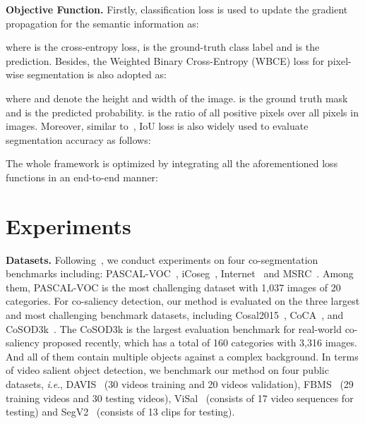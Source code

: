 \documentclass[journal]{IEEEtran}
\newcommand{\ie}{\textit{i}.\textit{e}., }
\begin{document}
\vspace{1ex}

\noindent \textbf{Objective Function.} Firstly, classification loss is used to update the gradient propagation for the semantic information as:


where  is the cross-entropy loss,  is the ground-truth class label and  is the prediction. Besides, the Weighted Binary Cross-Entropy (WBCE) loss for pixel-wise segmentation is also adopted as:



where  and  denote the height and width of the image.  is the ground truth mask and  is the predicted probability.  is the ratio of all positive pixels over all pixels in images. Moreover, similar to~\cite{qin2019basnet,fan2021group}, IoU loss is also widely used to evaluate segmentation accuracy as follows:



The whole framework is optimized by integrating all the aforementioned loss functions in an end-to-end manner:



\section{Experiments}

\noindent \textbf{Datasets.}  Following~\cite{zhang2021cyclesegnet,zhang2020deep}, we conduct experiments on four co-segmentation benchmarks including: PASCAL-VOC~\cite{everingham2015pascal}, iCoseg~\cite{batra2010icoseg}, Internet~\cite{rubinstein2013unsupervised} and MSRC~\cite{shotton2006textonboost}. Among them, PASCAL-VOC is the most challenging dataset with 1,037 images of 20 categories. 
For co-saliency detection, our method is evaluated on the three largest and most challenging benchmark datasets, including Cosal2015~\cite{zhang2015co}, CoCA~\cite{zhang2020gradient}, and CoSOD3k~\cite{fan2021re}. The CoSOD3k is the largest evaluation benchmark for real-world co-saliency proposed recently, which has a total of 160 categories with 3,316 images. And all of them contain multiple objects against a complex background. In terms of video salient object 
detection, we benchmark our method on four public datasets, \ie DAVIS~\cite{perazzi2016benchmark} (30 videos training and 20 videos validation), FBMS~\cite{ochs2013segmentation} (29 training videos and 30 testing videos), ViSal~\cite{wang2015consistent} (consists of 17 video sequences for testing) and SegV2~\cite{li2013video} (consists of 13 clips for testing).
\end{document}
